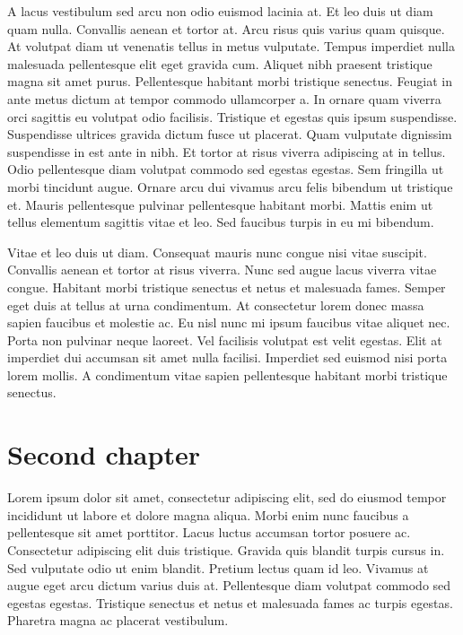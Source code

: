 \documentclass[epsf,a4paper]{book}
\begin{document}
A lacus vestibulum sed arcu non odio euismod lacinia at. Et leo duis ut diam quam nulla. Convallis aenean et tortor at. Arcu risus quis varius quam quisque. At volutpat diam ut venenatis tellus in metus vulputate. Tempus imperdiet nulla malesuada pellentesque elit eget gravida cum. Aliquet nibh praesent tristique magna sit amet purus. Pellentesque habitant morbi tristique senectus. Feugiat in ante metus dictum at tempor commodo ullamcorper a. In ornare quam viverra orci sagittis eu volutpat odio facilisis. Tristique et egestas quis ipsum suspendisse. Suspendisse ultrices gravida dictum fusce ut placerat. Quam vulputate dignissim suspendisse in est ante in nibh. Et tortor at risus viverra adipiscing at in tellus. Odio pellentesque diam volutpat commodo sed egestas egestas. Sem fringilla ut morbi tincidunt augue. Ornare arcu dui vivamus arcu felis bibendum ut tristique et. Mauris pellentesque pulvinar pellentesque habitant morbi. Mattis enim ut tellus elementum sagittis vitae et leo. Sed faucibus turpis in eu mi bibendum.

Vitae et leo duis ut diam. Consequat mauris nunc congue nisi vitae suscipit. Convallis aenean et tortor at risus viverra. Nunc sed augue lacus viverra vitae congue. Habitant morbi tristique senectus et netus et malesuada fames. Semper eget duis at tellus at urna condimentum. At consectetur lorem donec massa sapien faucibus et molestie ac. Eu nisl nunc mi ipsum faucibus vitae aliquet nec. Porta non pulvinar neque laoreet. Vel facilisis volutpat est velit egestas. Elit at imperdiet dui accumsan sit amet nulla facilisi. Imperdiet sed euismod nisi porta lorem mollis. A condimentum vitae sapien pellentesque habitant morbi tristique senectus.

\chapter{Second chapter}

Lorem ipsum dolor sit amet, consectetur adipiscing elit, sed do eiusmod tempor incididunt ut labore et dolore magna aliqua. Morbi enim nunc faucibus a pellentesque sit amet porttitor. Lacus luctus accumsan tortor posuere ac. Consectetur adipiscing elit duis tristique. Gravida quis blandit turpis cursus in. Sed vulputate odio ut enim blandit. Pretium lectus quam id leo. Vivamus at augue eget arcu dictum varius duis at. Pellentesque diam volutpat commodo sed egestas egestas. Tristique senectus et netus et malesuada fames ac turpis egestas. Pharetra magna ac placerat vestibulum.
\end{document}

